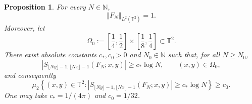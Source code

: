 \documentclass[11pt]{amsart}
\numberwithin{equation}{section}
\newtheorem{proposition}[theorem]{Proposition}
\begin{document}
\begin{proposition}
\label{prop:block} For every $N\in \mathbb{N}$, 
\begin{equation*}
\left\Vert F_{N}\right\Vert _{L^{2}(\mathbb{T}^{2})}=1.
\end{equation*}%
Moreover, let 
\begin{equation*}
\Omega _{0}:=\left[ \frac{1}{4},\frac{1}{2}\right] \times \left[ \frac{1}{8},%
\frac{1}{4}\right] \subset \mathbb{T}^{2}.
\end{equation*}%
There exist absolute constants $c_{\ast},c_0>0$ and $N_0\in\mathbb{N}$ such
that, for all $N\ge N_0$, 
\begin{equation}
\left|S_{\lfloor Ny\rfloor-1,\lfloor Nx\rfloor-1}(F_N;x,y)\right| \ge
c_{\ast}\log N, \qquad (x,y)\in\Omega_0,  \label{eq:block-large-S}
\end{equation}
and consequently 
\begin{equation*}
\mu_2\left\{(x,y)\in\mathbb{T}^2: \left|S_{\lfloor Ny\rfloor-1,\lfloor
Nx\rfloor-1}(F_N;x,y)\right| \ge c_{\ast}\log N\right\} \ge c_0.
\end{equation*}
One may take $c_{\ast}=1/(4\pi)$ and $c_0=1/32$.
\end{proposition}
\end{document}

